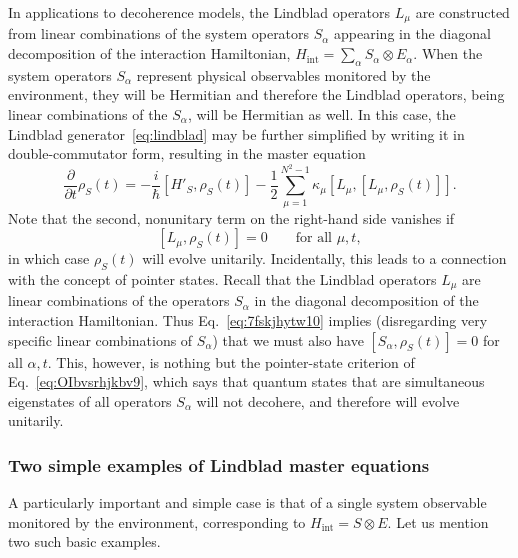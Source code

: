 \documentclass[3p,sort&compress]{elsarticle}
\newcommand{\I}{\ensuremath{i}}
\newcommand{\op}[1]{#1}
\begin{document}
In applications to decoherence models, the Lindblad operators $\op{L}_\mu$ are constructed from linear combinations of the system operators $\op{S}_\alpha$ appearing in the diagonal decomposition of the interaction Hamiltonian, $\op{H}_\text{int} = \sum_\alpha \op{S}_\alpha \otimes \op{E}_\alpha$. When the system operators $\op{S}_\alpha$ represent physical observables monitored by the environment, they will be Hermitian and therefore the Lindblad operators, being linear combinations of the $\op{S}_\alpha$, will be Hermitian as well. In this case, the Lindblad generator~\eqref{eq:lindblad} may be further simplified by writing it in double-commutator form, resulting in the master equation 
%
\begin{equation}\label{eq:lindbladc}
\frac{\partial}{\partial t} \op{\rho}_S(t) = - \frac{\I}{\hbar} \left[ \op{H}'_S, \op{\rho}_S(t) \right] - \frac{1}{2} \sum_{\mu=1}^{N^2-1} \kappa_\mu \left[ \op{L}_\mu, \left[ \op{L}_\mu, \op{\rho}_S(t) \right]
\right].
\end{equation}
%
Note that the second, nonunitary term on the right-hand side vanishes if 
%
\begin{equation}
  \label{eq:7fskjhytw10}
  \left[ \op{L}_\mu, \op{\rho}_S(t) \right] = 0 \qquad \text{for all $\mu,t$},
\end{equation}
%
in which case $\op{\rho}_S(t)$ will evolve unitarily. Incidentally, this leads to a connection with the concept of pointer states. Recall that the Lindblad operators $\op{L}_\mu$ are linear combinations of the operators $\op{S}_\alpha$ in the diagonal decomposition of the interaction Hamiltonian. Thus Eq.~\eqref{eq:7fskjhytw10} implies (disregarding very specific linear combinations of $\op{S}_\alpha$) that we must also have $\left[ \op{S}_\alpha, \op{\rho}_S(t) \right] = 0$ for all $\alpha, t$. This, however, is nothing but the pointer-state criterion of Eq.~\eqref{eq:OIbvsrhjkbv9}, which says that quantum states that are simultaneous eigenstates of all operators $\op{S}_\alpha$ will not decohere, and therefore will evolve unitarily.

\subsubsection{\label{sec:two-simple-examples}Two simple examples of Lindblad master equations}

A particularly important and simple case is that of a single system observable monitored by the environment, corresponding to $\op{H}_\text{int} = \op{S} \otimes \op{E}$. Let us mention two such basic examples. 
\end{document}
